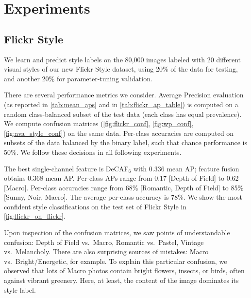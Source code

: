 \section{Experiments}



\subsection{Flickr Style}
We learn and predict style labels on the 80,000 images labeled with 20 different visual styles of our new Flickr Style dataset, using 20\% of the data for testing, and another 20\% for parameter-tuning validation.

There are several performance metrics we consider.
Average Precision evaluation (as reported in \autoref{tab:mean_aps} and in \autoref{tab:flickr_ap_table}) is computed on a random class-balanced subset of the test data (each class has equal prevalence).
We compute confusion matrices (\autoref{fig:flickr_conf}, \autoref{fig:wp_conf}, \autoref{fig:ava_style_conf}) on the same data.
Per-class accuracies are computed on subsets of the data balanced by the binary label, such that chance performance is 50\%.
We follow these decisions in all following experiments.

The best single-channel feature is DeCAF$_6$ with 0.336 mean AP; feature fusion obtains 0.368 mean AP.
Per-class APs range from 0.17 [Depth of Field] to  0.62 [Macro].
Per-class accuracies range from 68\% [Romantic, Depth of Field] to 85\% [Sunny, Noir, Macro].
The average per-class accuracy is 78\%.
We show the most confident style classifications on the test set of Flickr Style in \autoref{fig:flickr_on_flickr}.

Upon inspection of the confusion matrices, we saw points of understandable confusion: Depth of Field vs.~Macro, Romantic vs.~Pastel, Vintage vs.~Melancholy.
There are also surprising sources of mistakes: Macro vs.~Bright/Energetic, for example.
To explain this particular confusion, we observed that lots of Macro photos contain bright flowers, insects, or birds, often against vibrant greenery.
Here, at least, the content of the image dominates its style label.


